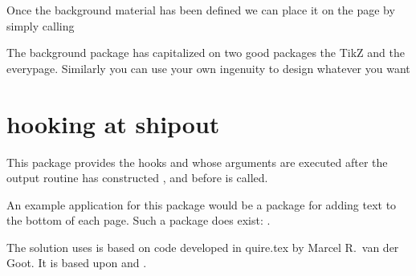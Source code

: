 
Once the background material has been defined we can place it on the page by simply calling

\begin{teXXX}
   \newcommand\BgThispage{\AddThispageHook{\bg@material}}
\end{teXXX}

The background package has capitalized on two good packages the TikZ and the everypage. Similarly you can use your own ingenuity to design whatever you want




\section{hooking at shipout}


This package provides the hooks  and 
   whose arguments are executed after the output 
  routine has constructed , and before  is 
  called.

  An example application for this package would be a package for
  adding text to the bottom of each page.
  Such a package does exist: \cite{package!prelim2e}.

The solution  uses is based on code developed in  \textsf{quire.tex} by
 Marcel R.~van der Goot.  It is based upon  and .



 






































